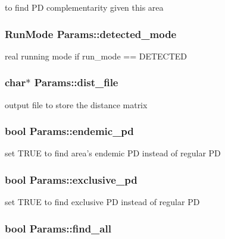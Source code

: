 \label{structParams_a1386d8afdf2ff06b85f3a0be5ddfa823}
to find PD complementarity given this area \hypertarget{structParams_ae90dd5c282eca93289af52cda370871b}{
\subsubsection[{detected\_\-mode}]{\setlength{\rightskip}{0pt plus 5cm}RunMode {\bf Params::detected\_\-mode}}}
\label{structParams_ae90dd5c282eca93289af52cda370871b}
real running mode if run\_\-mode == DETECTED \hypertarget{structParams_ae8c3ff238e4cf8e20c1d00304f45df9f}{
\subsubsection[{dist\_\-file}]{\setlength{\rightskip}{0pt plus 5cm}char$\ast$ {\bf Params::dist\_\-file}}}
\label{structParams_ae8c3ff238e4cf8e20c1d00304f45df9f}
output file to store the distance matrix \hypertarget{structParams_a122ecf2200489cc4464df2dac76c0128}{
\subsubsection[{endemic\_\-pd}]{\setlength{\rightskip}{0pt plus 5cm}bool {\bf Params::endemic\_\-pd}}}
\label{structParams_a122ecf2200489cc4464df2dac76c0128}
set TRUE to find area's endemic PD instead of regular PD \hypertarget{structParams_aa62226e3872e1c56ffdd034c19555789}{
\subsubsection[{exclusive\_\-pd}]{\setlength{\rightskip}{0pt plus 5cm}bool {\bf Params::exclusive\_\-pd}}}
\label{structParams_aa62226e3872e1c56ffdd034c19555789}
set TRUE to find exclusive PD instead of regular PD \hypertarget{structParams_ae91712db78b9355a45eb1f1d4301c6c3}{
\subsubsection[{find\_\-all}]{\setlength{\rightskip}{0pt plus 5cm}bool {\bf Params::find\_\-all}}}

